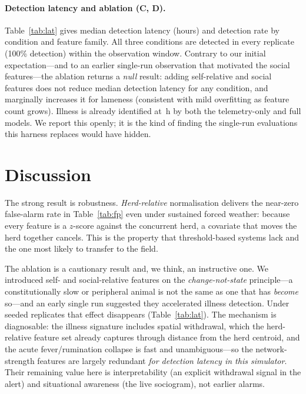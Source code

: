 \documentclass[11pt]{article}
\begin{document}
\paragraph{Detection latency and ablation (C, D).} Table~\ref{tab:lat} gives
median detection latency (hours) and detection rate by condition and feature
family. All three conditions are detected in every replicate (100\% detection)
within the observation window. Contrary to our initial expectation---and to an
earlier single-run observation that motivated the social features---the ablation
returns a \emph{null} result: adding self-relative and social features does not
reduce median detection latency for any condition, and marginally increases it
for lameness (consistent with mild overfitting as feature count grows). Illness
is already identified at \illlatsocial\,h by both the telemetry-only and full
models. We report this openly; it is the kind of finding the single-run
evaluations this harness replaces would have hidden.

\begin{table}[t]\centering
\caption{Median detection latency (h) and detection rate (\%) by condition and
feature family, over \numreplicates{} replicates.}
\label{tab:lat}

\end{table}

\section{Discussion}
The strong result is robustness. \emph{Herd-relative} normalisation delivers the
near-zero false-alarm rate in Table~\ref{tab:fp} even under sustained forced
weather: because every feature is a $z$-score against the concurrent herd, a
covariate that moves the herd together cancels. This is the property that
threshold-based systems lack and the one most likely to transfer to the field.

The ablation is a cautionary result and, we think, an instructive one. We
introduced self- and social-relative features on the \emph{change-not-state}
principle---a constitutionally slow or peripheral animal is not the same as one
that has \emph{become} so---and an early single run suggested they accelerated
illness detection. Under \numreplicates{} seeded replicates that effect
disappears (Table~\ref{tab:lat}). The mechanism is diagnosable: the illness
signature includes spatial withdrawal, which the herd-relative feature set
already captures through distance from the herd centroid, and the acute
fever/rumination collapse is fast and unambiguous---so the network-strength
features are largely redundant \emph{for detection latency in this simulator}.
Their remaining value here is interpretability (an explicit withdrawal signal in
the alert) and situational awareness (the live sociogram), not earlier alarms.
\end{document}
